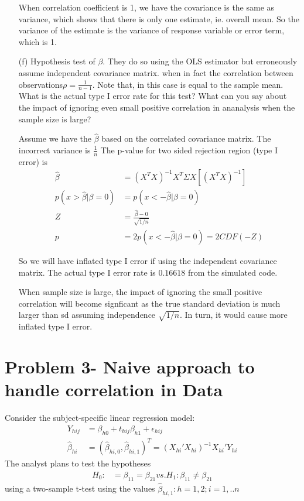 \documentclass[11pt]{article} %
\begin{document}
\begin{itemize}
When correlation coefficient is 1, we have the covariance is the same as variance, which shows that there is only one estimate, ie. overall mean. So the variance of the estimate is the variance of response variable or error term, which is 1.

\item[(f)] Hypothesis test of $\beta$. They do so using the OLS estimator but erroneously assume independent covariance matrix. when in fact the correlation between observations$\rho = \frac{1}{n-1}$. Note that, in this case is equal to the sample mean. What is the actual type I error rate for this test? What can you say about the impact of ignoring even small positive correlation in ananalysis when the sample size is large?

Assume we have the $\hat{\beta} $ based on the correlated covariance matrix. The incorrect variance is $\frac{1}{n}$
The p-value for two sided rejection region (type I error) is 
\begin{align*}
	\hat{\beta}  &= (X^T X)^{-1}X^T \Sigma X [(X^T X)^{-1}] \\
	p(x > \hat{\beta} | \beta = 0) &= p(x <- \hat{\beta} |  \beta = 0) \\
	Z &= \frac{ \hat{\beta} - 0}{\sqrt{1/n}} \\
	p &= 2 p(x <- \hat{\beta} | \beta = 0) = 2 CDF(-Z)
\end{align*}

So we will have inflated type I error if using the independent covariance matrix. The actual type I error rate is $ 0.16618$ from the simulated code.

When sample size is large, the impact of ignoring the small positive correlation will become signficant as the true standard deviation is much larger than sd assuming independence $\sqrt{1/n}$. In turn, it would cause more inflated type I error.
 
\end{itemize}

\section{Problem 3- Naive approach to handle correlation in Data}

Consider the subject-specific linear regression model:
\begin{align*}
	Y_{hij}  &= \beta_{h0} + t_{hij} \beta_{h1} + \epsilon_{hij} \\
	\hat{\beta}_{hi} &= (\hat{\beta}_{hi,0}, \hat{\beta}_{hi,1})^T = (X_{hi}' X_{hi})^{-1} X_{hi}' Y_{hi}
\end{align*}
The analyst plans to test the hypotheses 
\begin{align*}
	H_0:   &= \beta_{11} = \beta_{21} vs. H_1: \beta_{11} \neq \beta_{21}
\end{align*}
using a two-sample t-test using the values $\hat{\beta}_{hi,1}: h= 1,2 ; i= 1,..n $ 
\end{document}

